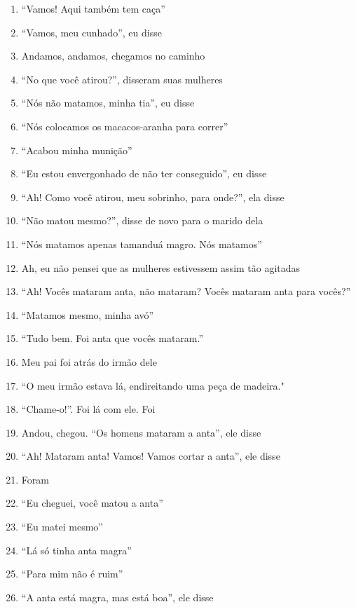 \begin{enumerate}
 \item ``Vamos! Aqui também tem caça''
 \item ``Vamos, meu cunhado'', eu disse
 \begin{center}\end{center}
 \item Andamos, andamos, chegamos no caminho
 \item ``No que você atirou?'', disseram suas mulheres
 \item ``Nós não matamos, minha tia'', eu disse
 \item ``Nós colocamos os macacos-aranha para correr''
 \item ``Acabou minha munição''
 \item ``Eu estou envergonhado de não ter conseguido'', eu disse
 \item ``Ah! Como você atirou, meu sobrinho, para onde?'', ela disse
 \item ``Não matou mesmo?'', disse de novo para o marido dela
 \item ``Nós matamos apenas tamanduá magro. Nós matamos''
 \begin{center}\end{center}
 \item Ah, eu não pensei que as mulheres estivessem assim tão agitadas
 \item ``Ah! Vocês mataram anta, não mataram? Vocês mataram anta para vocês?''
 \item ``Matamos mesmo, minha avó''
 \item ``Tudo bem. Foi anta que vocês mataram.''
 \item Meu pai foi atrás do irmão dele
 \item ``O meu irmão estava lá, endireitando uma peça de madeira."
 \item ``Chame-o!''. Foi lá com ele. Foi
 \item Andou, chegou. ``Os homens mataram a anta'', ele disse
 \item ``Ah! Mataram anta! Vamos! Vamos cortar a anta'', ele disse
 \item Foram
 \item ``Eu cheguei, você matou a anta''
 \item ``Eu matei mesmo''
 \item ``Lá só tinha anta magra''
 \item ``Para mim não é ruim''
 \item ``A anta está magra, mas está boa'', ele disse
 \begin{center}\end{center}

\end{enumerate}
